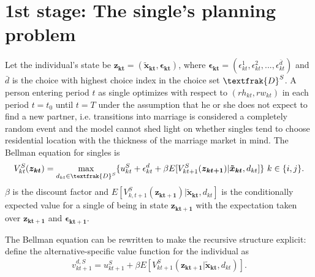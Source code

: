 \section{1st stage: The single's planning problem}
Let the individual's state be $\boldsymbol{z_{kt}}=(\boldsymbol{\tilde{x}_{kt}},\boldsymbol{\epsilon_{kt}})$, where $\boldsymbol{\epsilon_{kt}}=(\epsilon_{kt}^1,\epsilon_{kt}^2,...,\epsilon_{kt}^{\bar{d}})$ and $\bar{d}$ is the choice with highest choice index in the choice set $\textfrak{D}^S$. A person entering period $t$ as single optimizes with respect to $(rh_{kt},rw_{kt})$ in each period $t=t_0$ until $t=T$ under the assumption that he or she does not expect to find a new partner, i.e. transitions into marriage is considered a completely random event and the model cannot shed light on whether singles tend to choose residential location with the thickness of the marriage market in mind. The Bellman equation for singles is
\begin{align}
V_{kt}^S(\boldsymbol{z_{kt}})= \max_{d_{kt}\in \textfrak{D}^S}\{u_{kt}^S+\epsilon_{kt}^d+\beta E[V_{kt+1}^S(\boldsymbol{z_{kt+1}})|\boldsymbol{\tilde{x}_{kt}},d_{kt}]\} \text{ }k\in\{i,j\}.
\label{eq:Vk}
\end{align}
$\beta$ is the discount factor and $E[V_{k,t+1}^S(\boldsymbol{z_{kt+1}})|\boldsymbol{\tilde{x}_{kt}},d_{kt}]$ is the conditionally expected value for a single of being in state $\boldsymbol{z_{kt+1}}$ with the expectation taken over $\boldsymbol{z_{kt+1}}$ and $\boldsymbol{\epsilon_{kt+1}}$. 

The Bellman equation can be rewritten to make the recursive structure explicit: define the alternative-specific value function for the individual as
\begin{align}
v_{kt+1}^{d,S}=u_{kt+1}^S+\beta E[V_{kt+1}^S(\boldsymbol{z_{kt+1}}|\boldsymbol{\tilde{x}_{kt}},d_{kt})].
\label{eq:vk}
\end{align}

